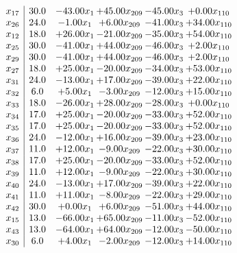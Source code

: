 \documentclass[8pt]{article}
\begin{document}
\[\begin{array}{c| c c@{\hskip 2pt} c@{\hskip 2pt} c@{\hskip 2pt} c@{\hskip 2pt} }
 x_{17}   &  30.0 & -43.00 x_{1} & + 45.00 x_{209} & -45.00 x_{3} & +  0.00 x_{110}\\
 x_{26}   &  24.0 & -1.00 x_{1} & +  6.00 x_{209} & -41.00 x_{3} & + 34.00 x_{110}\\
 x_{12}   &  18.0 & + 26.00 x_{1} & -21.00 x_{209} & -35.00 x_{3} & + 54.00 x_{110}\\
 x_{25}   &  30.0 & -41.00 x_{1} & + 44.00 x_{209} & -46.00 x_{3} & +  2.00 x_{110}\\
 x_{29}   &  30.0 & -41.00 x_{1} & + 44.00 x_{209} & -46.00 x_{3} & +  2.00 x_{110}\\
 x_{27}   &  18.0 & + 25.00 x_{1} & -20.00 x_{209} & -34.00 x_{3} & + 53.00 x_{110}\\
 x_{31}   &  24.0 & -13.00 x_{1} & + 17.00 x_{209} & -39.00 x_{3} & + 22.00 x_{110}\\
 x_{32}   &  6.0 & +  5.00 x_{1} & -3.00 x_{209} & -12.00 x_{3} & + 15.00 x_{110}\\
 x_{33}   &  18.0 & -26.00 x_{1} & + 28.00 x_{209} & -28.00 x_{3} & +  0.00 x_{110}\\
 x_{34}   &  17.0 & + 25.00 x_{1} & -20.00 x_{209} & -33.00 x_{3} & + 52.00 x_{110}\\
 x_{35}   &  17.0 & + 25.00 x_{1} & -20.00 x_{209} & -33.00 x_{3} & + 52.00 x_{110}\\
 x_{36}   &  24.0 & -12.00 x_{1} & + 16.00 x_{209} & -39.00 x_{3} & + 23.00 x_{110}\\
 x_{37}   &  11.0 & + 12.00 x_{1} & -9.00 x_{209} & -22.00 x_{3} & + 30.00 x_{110}\\
 x_{38}   &  17.0 & + 25.00 x_{1} & -20.00 x_{209} & -33.00 x_{3} & + 52.00 x_{110}\\
 x_{39}   &  11.0 & + 12.00 x_{1} & -9.00 x_{209} & -22.00 x_{3} & + 30.00 x_{110}\\
 x_{40}   &  24.0 & -13.00 x_{1} & + 17.00 x_{209} & -39.00 x_{3} & + 22.00 x_{110}\\
 x_{41}   &  11.0 & + 11.00 x_{1} & -8.00 x_{209} & -22.00 x_{3} & + 29.00 x_{110}\\
 x_{42}   &  30.0 & +  0.00 x_{1} & +  6.00 x_{209} & -51.00 x_{3} & + 44.00 x_{110}\\
 x_{15}   &  13.0 & -66.00 x_{1} & + 65.00 x_{209} & -11.00 x_{3} & -52.00 x_{110}\\
 x_{43}   &  13.0 & -64.00 x_{1} & + 64.00 x_{209} & -12.00 x_{3} & -50.00 x_{110}\\
 x_{30}   &  6.0 & +  4.00 x_{1} & -2.00 x_{209} & -12.00 x_{3} & + 14.00 x_{110}\\

\end{array}\]
\end{document}
